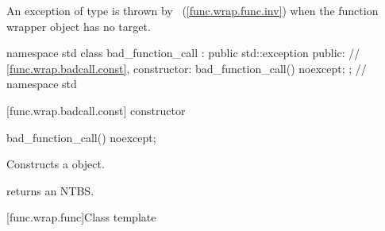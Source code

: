\pnum
An exception of type  is thrown by
~(\ref{func.wrap.func.inv})
when the function wrapper object has no target.

\begin{codeblock}
namespace std {
  class bad_function_call : public std::exception {
  public:
    // \ref{func.wrap.badcall.const}, constructor:
    bad_function_call() noexcept;
  };
} // namespace std
\end{codeblock}

[func.wrap.badcall.const]{ constructor}

%
\begin{itemdecl}
bad_function_call() noexcept;
\end{itemdecl}

\begin{itemdescr}
\pnum\effects Constructs a  object.
\end{itemdescr}

\begin{itemdescr}
\pnum\postcondition  {} returns an
 NTBS.
\end{itemdescr}

[func.wrap.func]{Class template }

